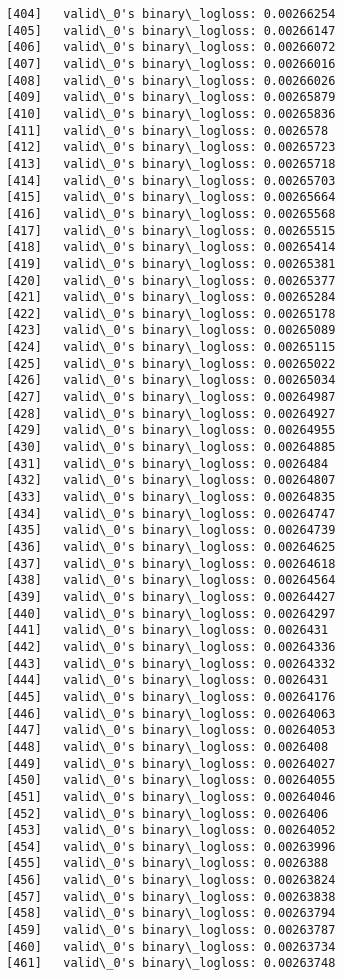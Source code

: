 \documentclass[11pt]{article}
\begin{document}
\begin{Verbatim}[commandchars=\\\{\}]
[404]	valid\_0's binary\_logloss: 0.00266254
[405]	valid\_0's binary\_logloss: 0.00266147
[406]	valid\_0's binary\_logloss: 0.00266072
[407]	valid\_0's binary\_logloss: 0.00266016
[408]	valid\_0's binary\_logloss: 0.00266026
[409]	valid\_0's binary\_logloss: 0.00265879
[410]	valid\_0's binary\_logloss: 0.00265836
[411]	valid\_0's binary\_logloss: 0.0026578
[412]	valid\_0's binary\_logloss: 0.00265723
[413]	valid\_0's binary\_logloss: 0.00265718
[414]	valid\_0's binary\_logloss: 0.00265703
[415]	valid\_0's binary\_logloss: 0.00265664
[416]	valid\_0's binary\_logloss: 0.00265568
[417]	valid\_0's binary\_logloss: 0.00265515
[418]	valid\_0's binary\_logloss: 0.00265414
[419]	valid\_0's binary\_logloss: 0.00265381
[420]	valid\_0's binary\_logloss: 0.00265377
[421]	valid\_0's binary\_logloss: 0.00265284
[422]	valid\_0's binary\_logloss: 0.00265178
[423]	valid\_0's binary\_logloss: 0.00265089
[424]	valid\_0's binary\_logloss: 0.00265115
[425]	valid\_0's binary\_logloss: 0.00265022
[426]	valid\_0's binary\_logloss: 0.00265034
[427]	valid\_0's binary\_logloss: 0.00264987
[428]	valid\_0's binary\_logloss: 0.00264927
[429]	valid\_0's binary\_logloss: 0.00264955
[430]	valid\_0's binary\_logloss: 0.00264885
[431]	valid\_0's binary\_logloss: 0.0026484
[432]	valid\_0's binary\_logloss: 0.00264807
[433]	valid\_0's binary\_logloss: 0.00264835
[434]	valid\_0's binary\_logloss: 0.00264747
[435]	valid\_0's binary\_logloss: 0.00264739
[436]	valid\_0's binary\_logloss: 0.00264625
[437]	valid\_0's binary\_logloss: 0.00264618
[438]	valid\_0's binary\_logloss: 0.00264564
[439]	valid\_0's binary\_logloss: 0.00264427
[440]	valid\_0's binary\_logloss: 0.00264297
[441]	valid\_0's binary\_logloss: 0.0026431
[442]	valid\_0's binary\_logloss: 0.00264336
[443]	valid\_0's binary\_logloss: 0.00264332
[444]	valid\_0's binary\_logloss: 0.0026431
[445]	valid\_0's binary\_logloss: 0.00264176
[446]	valid\_0's binary\_logloss: 0.00264063
[447]	valid\_0's binary\_logloss: 0.00264053
[448]	valid\_0's binary\_logloss: 0.0026408
[449]	valid\_0's binary\_logloss: 0.00264027
[450]	valid\_0's binary\_logloss: 0.00264055
[451]	valid\_0's binary\_logloss: 0.00264046
[452]	valid\_0's binary\_logloss: 0.0026406
[453]	valid\_0's binary\_logloss: 0.00264052
[454]	valid\_0's binary\_logloss: 0.00263996
[455]	valid\_0's binary\_logloss: 0.0026388
[456]	valid\_0's binary\_logloss: 0.00263824
[457]	valid\_0's binary\_logloss: 0.00263838
[458]	valid\_0's binary\_logloss: 0.00263794
[459]	valid\_0's binary\_logloss: 0.00263787
[460]	valid\_0's binary\_logloss: 0.00263734
[461]	valid\_0's binary\_logloss: 0.00263748

\end{Verbatim}
\end{document}
